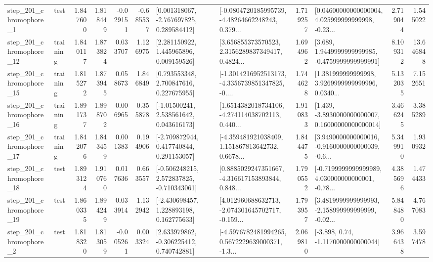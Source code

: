 \begin{tabular}{llrrrrllrlrr}
   step\_201\_chromophore\_1 &      test &      1.847600 &    1.818449 &     -0.029151 & -0.685537 &    [0.001318067, -2.767697825, 0.289584412] &  [-0.0804720185995739, -4.48264662248243, 0.379... &       1.719257 &  [0.04600000000000004, 4.025999999999998, -0.23... &            2.719044 &          1.545022 \\
  step\_201\_chromophore\_12 &  training &      1.840117 &    1.873824 &      0.033707 &  1.126975 &     [2.281150922, 1.445965896, 0.009159526] &  [3.656855373570523, 2.3156289837349417, 0.4824... &       1.694962 &   [3.689, 1.9449999999999985, -0.4759999999999991] &            8.109312 &         13.646848 \\
  step\_201\_chromophore\_15 &  training &      1.815272 &    1.873945 &      0.058673 &  1.846849 &     [0.793553348, 2.700847616, 0.227675955] &  [-1.3014216952513173, -4.3356739851347825, -0.... &       1.744628 &  [1.381999999999998, 3.9269999999999996, 0.0340... &            5.132035 &          7.152651 \\
  step\_201\_chromophore\_16 &  training &      1.891737 &    1.898702 &      0.006965 &  0.355878 &     [-1.01500241, 2.538561642, 0.043616173] &  [1.6514382018734106, -4.274114038702113, 0.440... &       1.910833 &  [1.439, -3.8930000000000007, 0.16000000000000014] &            3.466245 &          3.385289 \\
  step\_201\_chromophore\_17 &  training &      1.842076 &    1.843459 &      0.001383 &  0.194906 &    [-2.709872944, 0.417740844, 0.291153057] &  [-4.359481921038409, 1.151867813642732, 0.6678... &       1.844475 &  [3.9490000000000016, -0.9160000000000039, -0.6... &            5.349910 &          1.930932 \\
  step\_201\_chromophore\_18 &      test &      1.893124 &    1.910760 &      0.017636 &  0.663557 &   [-0.506248215, 2.572837825, -0.710343061] &  [0.8885029247351667, -4.316617153893844, 0.848... &       1.790552 &  [-0.7199999999999989, 4.030000000000001, -0.78... &            4.385696 &          1.474433 \\
  step\_201\_chromophore\_19 &      test &      1.860335 &    1.894249 &      0.033914 &  1.132942 &    [-2.430698457, 1.228893198, 0.162775633] &  [4.012960688632713, -2.074301645702717, -0.159... &       1.793957 &  [3.4819999999999993, -2.158999999999999, -0.02... &            5.848480 &          4.767083 \\
   step\_201\_chromophore\_2 &      test &      1.818320 &    1.813059 &     -0.005261 &  0.003324 &    [2.633979862, -0.306225412, 0.740742881] &  [-4.5976782481994265, 0.5672229639000371, -1.3... &       2.069810 &                [-3.898, 0.74, -1.1170000000000044] &            3.966438 &          3.597478 \\

\end{tabular}
